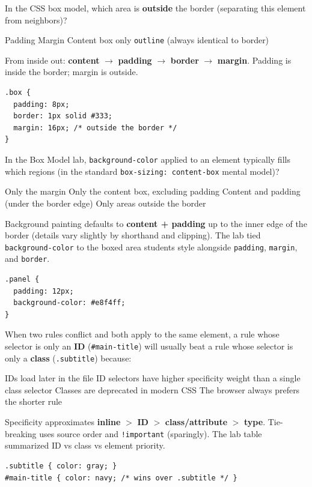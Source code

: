 \question[4]
In the CSS box model, which area is \textbf{outside} the border (separating this element from neighbors)?
\begin{choices}
  \choice Padding
  \CorrectChoice Margin
  \choice Content box only
  \choice \texttt{outline} (always identical to border)
\end{choices}
\begin{solution}
  From inside out: \textbf{content} $\rightarrow$ \textbf{padding} $\rightarrow$ \textbf{border} $\rightarrow$ \textbf{margin}. Padding is inside the border; margin is outside.
\begin{lstlisting}[style=cssexam]
.box {
  padding: 8px;
  border: 1px solid #333;
  margin: 16px; /* outside the border */
}
\end{lstlisting}
\end{solution}

\question[4]
In the Box Model lab, \texttt{background-color} applied to an element typically fills which regions (in the standard \texttt{box-sizing: content-box} mental model)?
\begin{choices}
  \choice Only the margin
  \choice Only the content box, excluding padding
  \CorrectChoice Content and padding (under the border edge)
  \choice Only areas outside the border
\end{choices}
\begin{solution}
  Background painting defaults to \textbf{content + padding} up to the inner edge of the border (details vary slightly by shorthand and clipping). The lab tied \texttt{background-color} to the boxed area students style alongside \texttt{padding}, \texttt{margin}, and \texttt{border}.
\begin{lstlisting}[style=cssexam]
.panel {
  padding: 12px;
  background-color: #e8f4ff;
}
\end{lstlisting}
\end{solution}


\newpage
\question[4]
When two rules conflict and both apply to the same element, a rule whose selector is only an \textbf{ID} (\texttt{\#main-title}) will usually beat a rule whose selector is only a \textbf{class} (\texttt{.subtitle}) because:
\begin{choices}
  \choice IDs load later in the file
  \CorrectChoice ID selectors have higher specificity weight than a single class selector
  \choice Classes are deprecated in modern CSS
  \choice The browser always prefers the shorter rule
\end{choices}
\begin{solution}
  Specificity approximates \textbf{inline} $>$ \textbf{ID} $>$ \textbf{class/attribute} $>$ \textbf{type}. Tie-breaking uses source order and \texttt{!important} (sparingly). The lab table summarized ID vs class vs element priority.
\begin{lstlisting}[style=cssexam]
.subtitle { color: gray; }
#main-title { color: navy; /* wins over .subtitle */ }
\end{lstlisting}
\end{solution}

